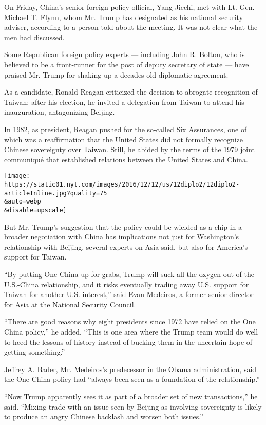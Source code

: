 On Friday, China's senior foreign policy official, Yang Jiechi, met with
Lt. Gen. Michael T. Flynn, whom Mr. Trump has designated as his national
security adviser, according to a person told about the meeting. It was
not clear what the men had discussed.

Some Republican foreign policy experts --- including John R. Bolton, who
is believed to be a front-runner for the post of deputy secretary of
state --- have praised Mr. Trump for shaking up a decades-old diplomatic
agreement.

As a candidate, Ronald Reagan criticized the decision to abrogate
recognition of Taiwan; after his election, he invited a delegation from
Taiwan to attend his inauguration, antagonizing Beijing.

In 1982, as president, Reagan pushed for the so-called Six Assurances,
one of which was a reaffirmation that the United States did not formally
recognize Chinese sovereignty over Taiwan. Still, he abided by the terms
of the 1979 joint communiqué that established relations between the
United States and China.

\texttt{[image: https://static01.nyt.com/images/2016/12/12/us/12diplo2/12diplo2-articleInline.jpg?quality=75\\\&auto=webp\\\&disable=upscale]}

But Mr. Trump's suggestion that the policy could be wielded as a chip in
a broader negotiation with China has implications not just for
Washington's relationship with Beijing, several experts on Asia said,
but also for America's support for Taiwan.

``By putting One China up for grabs, Trump will suck all the oxygen out
of the U.S.-China relationship, and it risks eventually trading away
U.S. support for Taiwan for another U.S. interest,'' said Evan Medeiros,
a former senior director for Asia at the National Security Council.

``There are good reasons why eight presidents since 1972 have relied on
the One China policy,'' he added. ``This is one area where the Trump
team would do well to heed the lessons of history instead of bucking
them in the uncertain hope of getting something.''

Jeffrey A. Bader, Mr. Medeiros's predecessor in the Obama
administration, said the One China policy had ``always been seen as a
foundation of the relationship.''

``Now Trump apparently sees it as part of a broader set of new
transactions,'' he said. ``Mixing trade with an issue seen by Beijing as
involving sovereignty is likely to produce an angry Chinese backlash and
worsen both issues.''

